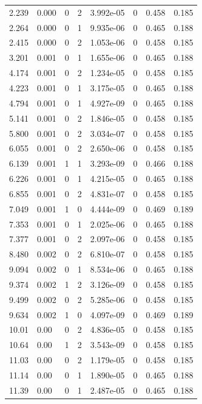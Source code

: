 \documentclass[preview]{standalone}
\begin{document}
{{\begin{tabular}{L{1.2cm}C{1.2cm} C{0.3cm}C{0.5cm} C{1.4cm}C{1.4cm} C{1.4cm}C{1.4cm}}
  2.239  &  0.000  & 0     &  2 &  3.992e-05  & 0  & 0.458 &  0.185   \\ 
  2.264  &  0.000  & 0     &  1 &  9.935e-06  & 0  & 0.465 &  0.188   \\ 
  2.415  &  0.000  & 0     &  2 &  1.053e-06  & 0  & 0.458 &  0.185   \\ 
  3.201  &  0.001  & 0     &  1 &  1.655e-06  & 0  & 0.465 &  0.188   \\ 
  4.174  &  0.001  & 0     &  2 &  1.234e-05  & 0  & 0.458 &  0.185   \\ 
  4.223  &  0.001  & 0     &  1 &  3.175e-05  & 0  & 0.465 &  0.188   \\ 
  4.794  &  0.001  & 0     &  1 &  4.927e-09  & 0  & 0.465 &  0.188   \\ 
  5.141  &  0.001  & 0     &  2 &  1.846e-05  & 0  & 0.458 &  0.185   \\ 
  5.800  &  0.001  & 0     &  2 &  3.034e-07  & 0  & 0.458 &  0.185   \\ 
  6.055  &  0.001  & 0     &  2 &  2.650e-06  & 0  & 0.458 &  0.185   \\ 
  6.139  &  0.001  & 1     &  1 &  3.293e-09  & 0  & 0.466 &  0.188   \\ 
  6.226  &  0.001  & 0     &  1 &  4.215e-05  & 0  & 0.465 &  0.188   \\ 
  6.855  &  0.001  & 0     &  2 &  4.831e-07  & 0  & 0.458 &  0.185   \\ 
  7.049  &  0.001  & 1     &  0 &  4.444e-09  & 0  & 0.469 &  0.189   \\ 
  7.353  &  0.001  & 0     &  1 &  2.025e-06  & 0  & 0.465 &  0.188   \\ 
  7.377  &  0.001  & 0     &  2 &  2.097e-06  & 0  & 0.458 &  0.185   \\ 
  8.480  &  0.002  & 0     &  2 &  6.810e-07  & 0  & 0.458 &  0.185   \\ 
  9.094  &  0.002  & 0     &  1 &  8.534e-06  & 0  & 0.465 &  0.188   \\ 
  9.374  &  0.002  & 1     &  2 &  3.126e-09  & 0  & 0.458 &  0.185   \\ 
  9.499  &  0.002  & 0     &  2 &  5.285e-06  & 0  & 0.458 &  0.185   \\ 
  9.634  &  0.002  & 1     &  0 &  4.097e-09  & 0  & 0.469 &  0.189   \\ 
  10.01  &  0.00  & 0     &  2 &  4.836e-05  & 0  & 0.458 &  0.185   \\ 
  10.64  &  0.00  & 1     &  2 &  3.543e-09  & 0  & 0.458 &  0.185   \\ 
  11.03  &  0.00  & 0     &  2 &  1.179e-05  & 0  & 0.458 &  0.185   \\ 
  11.14  &  0.00  & 0     &  1 &  1.890e-05  & 0  & 0.465 &  0.188   \\ 
  11.39  &  0.00  & 0     &  1 &  2.487e-05  & 0  & 0.465 &  0.188   \\ 
\hline 
\end{tabular} 

}}
\end{document}
